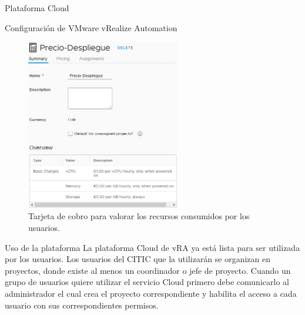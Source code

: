 \begin{subsection}{Plataforma Cloud}
\begin{subsubsection}{Configuración de VMware vRealize Automation}
        \begin{figure}[h]
            \centering
            \includegraphics[width=0.6\textwidth]{imaxes/pruebaconcepto/vrealize/pricing-card.png}
            \caption{Tarjeta de cobro para valorar los recursos consumidos por los usuarios.}
            \label{fig:pricing-card}
        \end{figure}
        \FloatBarrier

    \end{subsubsection}

    \begin{subsubsection}{Uso de la plataforma}
        La plataforma Cloud de vRA ya está lista para ser utilizada por los usuarios. Los usuarios del CITIC que la utilizarán se organizan en proyectos, donde existe al menos un coordinador o jefe de proyecto. Cuando un grupo de usuarios quiere utilizar el servicio Cloud primero debe comunicarlo al administrador el cual crea el proyecto correspondiente y habilita el acceso a cada usuario con sus correspondientes permisos.


\end{subsubsection}
\end{subsection}

